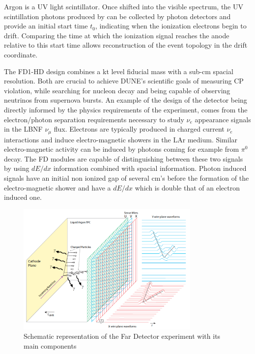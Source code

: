 Argon is a UV light scintillator. Once shifted into the visible spectrum, the UV scintillation photons produced by can be collected by photon detectors and provide an initial start time $t_0$, indicating when the ionization electrons begin to drift. Comparing the time at which the ionization signal reaches the anode relative to this start time allows reconstruction of the event topology in the drift coordinate. 

The FD1-HD design combines a kt level fiducial mass with a sub-cm spacial resolution. Both are crucial to achieve DUNE's scientific goals of measuring CP violation, while searching for nucleon decay and being capable of observing neutrinos from supernova bursts. An example of the design of the detector being directly informed by the physics requirements of the experiment, comes from the electron/photon separation requirements necessary to study $\nu_e$ appearance signals in the LBNF $\nu_\mu$ flux. Electrons are typically produced in charged current $\nu_e$ interactions and induce electro-magnetic showers in the LAr medium. Similar electro-magnetic activity can be induced by photons coming for example from $\pi^0$ decay. The FD modules are capable of distinguishing between these two signals by using $dE/dx$ information combined with spacial information. Photon induced signals have an initial non ionized gap of several cm's before the formation of the electro-magnetic shower and have a $dE/dx$ which is double that of an electron induced one.

\begin{figure}[!t]
     \centering
     \includegraphics[width=0.8\textwidth]{figures/ch3-DUNE/TheBoPicture.png}
     \caption{Schematic representation of the Far Detector experiment with its main components}
        \label{fig:LArTPCdiagram}
\end{figure}


